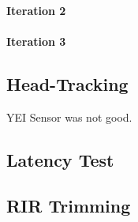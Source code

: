 \documentclass[../../main.tex]{subfiles}
\begin{document}

		 \paragraph{Iteration 2}

		 \paragraph{Iteration 3}
		 \label{iteration3}



	\subsection{Head-Tracking}
		YEI Sensor was not good.


	\subsection{Latency Test}
	
	\subsection{RIR Trimming}
\end{document}

